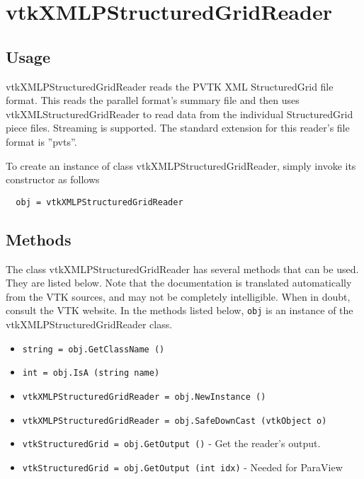 \section{vtkXMLPStructuredGridReader}

\subsection{Usage}

 vtkXMLPStructuredGridReader reads the PVTK XML StructuredGrid file
 format.  This reads the parallel format's summary file and then
 uses vtkXMLStructuredGridReader to read data from the individual
 StructuredGrid piece files.  Streaming is supported.  The standard
 extension for this reader's file format is ''pvts''.

To create an instance of class vtkXMLPStructuredGridReader, simply
invoke its constructor as follows
\begin{verbatim}
  obj = vtkXMLPStructuredGridReader
\end{verbatim}
\subsection{Methods}

The class vtkXMLPStructuredGridReader has several methods that can be used.
  They are listed below.
Note that the documentation is translated automatically from the VTK sources,
and may not be completely intelligible.  When in doubt, consult the VTK website.
In the methods listed below, \verb|obj| is an instance of the vtkXMLPStructuredGridReader class.
\begin{itemize}
\item  \verb|string = obj.GetClassName ()|

\item  \verb|int = obj.IsA (string name)|

\item  \verb|vtkXMLPStructuredGridReader = obj.NewInstance ()|

\item  \verb|vtkXMLPStructuredGridReader = obj.SafeDownCast (vtkObject o)|

\item  \verb|vtkStructuredGrid = obj.GetOutput ()| -  Get the reader's output.

\item  \verb|vtkStructuredGrid = obj.GetOutput (int idx)| -  Needed for ParaView

\end{itemize}
